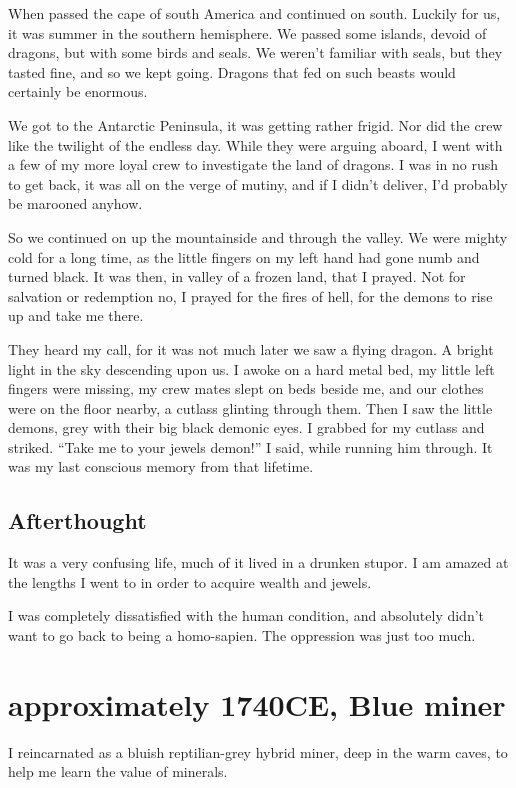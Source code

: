 When passed the cape of south America and continued on south. Luckily for us, it was summer in the southern hemisphere. We passed some islands, devoid of dragons, but with some birds and seals.  We weren’t familiar with seals, but they tasted fine, and so we kept going.   Dragons that fed on such beasts would certainly be enormous.

We got to the Antarctic Peninsula, it was getting rather frigid. Nor did the crew like the twilight of the endless day.  While they were arguing aboard, I went with a few of my more loyal crew to investigate the land of dragons.  I was in no rush to get back, it was all on the verge of mutiny, and if I didn’t deliver, I’d probably be marooned anyhow.


So we continued on up the mountainside and through the valley.  We were mighty cold for a long time, as the little fingers on my left hand had gone numb and turned black.  It was then,  in valley of a frozen land, that I prayed. Not for salvation or redemption no, I prayed for the fires of hell,  for the demons to rise up and take me there.

They heard my call, for it was not much later we saw a flying dragon. A bright
light in the sky descending upon us. I awoke on a hard metal bed, my little left
fingers were missing, my crew mates slept on beds beside me, and our clothes
were on the floor nearby, a cutlass glinting through them. Then I saw the little
demons, grey with their big black demonic eyes.  I grabbed for my cutlass and
striked. “Take me to your jewels demon!” I said, while running him through.  It was my last conscious memory from that lifetime.

\section{Afterthought}
It was a very confusing life, much of it lived in a drunken stupor. 
I am amazed at the lengths I went to in order to acquire wealth and jewels.

I was completely dissatisfied with the human condition, and absolutely didn't
want to go back to being a homo-sapien. The oppression was just too much.


\chapter{approximately 1740CE, Blue miner}\label{greyMiner}
I reincarnated as a bluish reptilian-grey hybrid miner, deep in the warm caves,
to help me learn the value of minerals.

